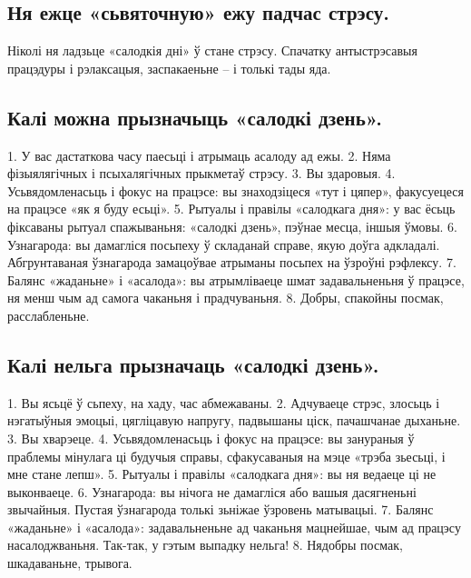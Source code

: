 \subsection{Ня ежце «сьвяточную» ежу падчас стрэсу.}
Ніколі ня ладзьце «салодкія дні» ў стане стрэсу. Спачатку антыстрэсавыя працэдуры і рэлаксацыя, заспакаеньне – і толькі тады яда.

\subsection{Калі можна прызначыць «салодкі дзень».}
1. У вас дастаткова часу паесьці і атрымаць асалоду ад ежы.
2. Няма фізыялягічных і псыхалягічных прыкметаў стрэсу.
3. Вы здаровыя.
4. Усьвядомленасьць і фокус на працэсе: вы знаходзіцеся «тут і цяпер», факусуецеся на працэсе «як я буду есьці».
5. Рытуалы і правілы «салодкага дня»: у вас ёсьць фіксаваны рытуал спажываньня: «салодкі дзень», пэўнае месца, іншыя ўмовы.
6. Узнагарода: вы дамагліся посьпеху ў складанай справе, якую доўга адкладалі. Абгрунтаваная ўзнагарода замацоўвае атрыманы посьпех на ўзроўні рэфлексу.
7. Балянс «жаданьне» і «асалода»: вы атрымліваеце шмат задавальненьня ў працэсе, ня менш чым ад самога чаканьня і прадчуваньня.
8. Добры, спакойны посмак, расслабленьне.

\subsection{Калі нельга прызначаць «салодкі дзень».}
1. Вы ясьцё ў сьпеху, на хаду, час абмежаваны.
2. Адчуваеце стрэс, злосьць і нэгатыўныя эмоцыі, цягліцавую напругу, падвышаны ціск, пачашчанае дыханьне.
3. Вы хварэеце.
4. Усьвядомленасьць і фокус на працэсе: вы занураныя ў праблемы мінулага ці будучыя справы, сфакусаваныя на мэце «трэба зьесьці, і мне стане лепш».
5. Рытуалы і правілы «салодкага дня»: вы ня ведаеце ці не выконваеце.
6. Узнагарода: вы нічога не дамагліся або вашыя дасягненьні звычайныя. Пустая ўзнагарода толькі зьніжае ўзровень матывацыі.
7. Балянс «жаданьне» і «асалода»: задавальненьне ад чаканьня мацнейшае, чым ад працэсу насалоджваньня. Так-так, у гэтым выпадку нельга!
8. Нядобры посмак, шкадаваньне, трывога.
